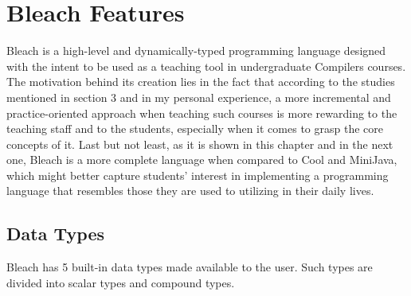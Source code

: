 \section{Bleach Features}
Bleach is a high-level and dynamically-typed programming language designed with the intent to be used as a teaching tool in undergraduate Compilers courses. The motivation behind its creation lies in the fact that according to the studies mentioned in section 3 and in my personal experience, a more incremental and practice-oriented approach when teaching such courses is more rewarding to the teaching staff and to the students, especially when it comes to grasp the core concepts of it. Last but not least, as it is shown in this chapter and in the next one, Bleach is a more complete language when compared to Cool and MiniJava, which might better capture students' interest in implementing a programming language that resembles those they are used to utilizing in their daily lives.

\subsection{Data Types}
Bleach has 5 built-in data types made available to the user. Such types are divided into scalar types  and compound types.

